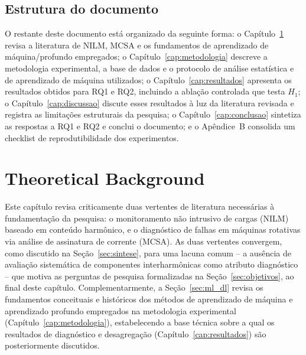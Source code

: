 \documentclass[times,final]{elsarticle}
\begin{document}
{\subsection{Estrutura do documento}
O restante deste documento está organizado da seguinte forma: o Capítulo~\ref{cap:fundamentacao} revisa a literatura de NILM, MCSA e os fundamentos de aprendizado de máquina/profundo empregados; o Capítulo~\ref{cap:metodologia} descreve a metodologia experimental, a base de dados e o protocolo de análise estatística e de aprendizado de máquina utilizados; o Capítulo~\ref{cap:resultados} apresenta os resultados obtidos para RQ1 e RQ2, incluindo a ablação controlada que testa $H_1$; o Capítulo~\ref{cap:discussao} discute esses resultados à luz da literatura revisada e registra as limitações estruturais da pesquisa; o Capítulo~\ref{cap:conclusao} sintetiza as respostas a RQ1 e RQ2 e conclui o documento; e o Apêndice~B consolida um checklist de reprodutibilidade dos experimentos.
}
\section{Theoretical Background}
\label{cap:fundamentacao}
Este capítulo revisa criticamente duas vertentes de literatura necessárias à fundamentação da pesquisa: o monitoramento não intrusivo de cargas (NILM) baseado em conteúdo harmônico, e o diagnóstico de falhas em máquinas rotativas via análise de assinatura de corrente (MCSA). As duas vertentes convergem, como discutido na Seção~\ref{sec:sintese}, para uma lacuna comum -- a ausência de avaliação sistemática de componentes interharmônicas como atributo diagnóstico -- que motiva as perguntas de pesquisa formalizadas na Seção~\ref{sec:objetivos}, ao final deste capítulo. Complementarmente, a Seção~\ref{sec:ml_dl} revisa os fundamentos conceituais e históricos dos métodos de aprendizado de máquina e aprendizado profundo empregados na metodologia experimental (Capítulo~\ref{cap:metodologia}), estabelecendo a base técnica sobre a qual os resultados de diagnóstico e desagregação (Capítulo~\ref{cap:resultados}) são posteriormente discutidos.
\end{document}
